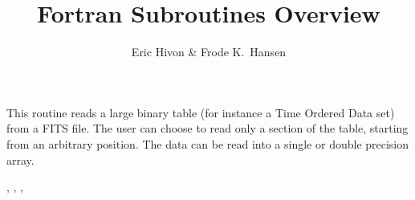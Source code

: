 
\sloppy


\title{\healpix Fortran Subroutines Overview}
 \section[input\_tod*]{ }
\label{sub:input_tod}
\author{Eric Hivon \& Frode K.~Hansen}

\begin{facility}
{This routine reads a large binary table (for instance a Time Ordered Data
 set) from a FITS file. The user can choose to read only a section of the table,
 starting from an arbitrary position. 
The data can be read into a single or double precision array.}
{\modFitstools}
\end{facility}

\begin{f90format}
{%
, %
, %
, %
 }
\end{f90format}

